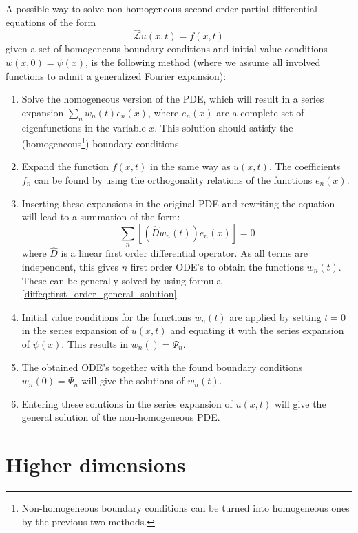 	\begin{method}
		A possible way to solve non-homogeneous second order partial differential equations of the form \[\hat{\mathcal{L}}u(x, t) = f(x, t)\] given a set of homogeneous boundary conditions and initial value conditions $w(x, 0) = \psi(x)$, is the following method (where we assume all involved functions to admit a generalized Fourier expansion):
		\begin{enumerate}
			\item Solve the homogeneous version of the PDE, which will result in a series expansion $\sum_nw_n(t)e_n(x)$, where $e_n(x)$ are a complete set of eigenfunctions in the variable $x$. This solution should satisfy the (homogeneous\footnote{Non-homogeneous boundary conditions can be turned into homogeneous ones by the previous two methods.}) boundary conditions.
			\item Expand the function $f(x, t)$ in the same way as $u(x, t)$. The coefficients $f_n$ can be found by using the orthogonality relations of the functions $e_n(x)$.
			\item Inserting these expansions in the original PDE and rewriting the equation will lead to a summation of the form: \[\sum_n\left[\left(\hat{D}w_n(t)\right)e_n(x)\right] = 0\] where $\hat{D}$ is a linear first order differential operator. As all terms are independent, this gives $n$ first order ODE's to obtain the functions $w_n(t)$. These can be generally solved by using formula \ref{diffeq:first_order_general_solution}.
			\item Initial value conditions for the functions $w_n(t)$ are applied by setting $t=0$ in the series expansion of $u(x, t)$ and equating it with the series expansion of $\psi(x)$. This results in $w_n() = \Psi_n$.
			\item The obtained ODE's together with the found boundary conditions $w_n(0) = \Psi_n$ will give the solutions of $w_n(t)$.
			\item Entering these solutions in the series expansion of $u(x, t)$ will give the general solution of the non-homogeneous PDE.
		\end{enumerate}
	\end{method}

\section{Higher dimensions}

